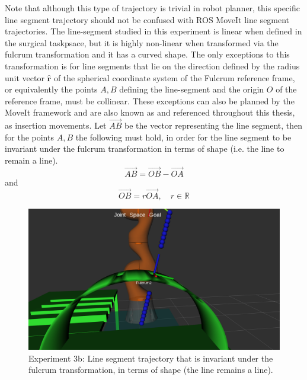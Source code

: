 Note that although this type of trajectory is trivial in robot planner, this specific line segment trajectory should not be confused with ROS MoveIt line segment trajectories. The line-segment studied in this experiment 
is linear when defined in the surgical taskpsace, but it is highly non-linear when transformed via the fulcrum transformation and it has a curved shape. The only exceptions to this transformation is for line segments that 
lie on the direction defined by the radius unit vector $\mathbf{\hat{r}}$ of the spherical coordinate system of the Fulcrum reference frame, or equivalently the points $A,B$ defining the line-segment and the origin $O$ 
of the reference frame, must be collinear. These exceptions can also be planned by the MoveIt framework and are also known 
as and referenced throughout this thesis, as insertion movements. Let $\overrightarrow{AB}$ be the vector representing the line segment, then for the points $A, B$ the following must hold, in order for the line segment to be 
invariant under the fulcrum transformation in terms of shape (i.e. the line to remain a line).
\begin{equation}
\overrightarrow{AB} = \overrightarrow{OB} - \overrightarrow{OA}
\end{equation} 
and
\begin{equation}
\overrightarrow{OB} = r \overrightarrow{OA}, \quad r \in \mathbb{R}
\end{equation}

\begin{center}
\begin{figure}[!htb]
\centering
\includegraphics[width=\textwidth]{images/robot_planner3/3b_line_seg_invariant.png}
\caption{Experiment 3b: Line segment trajectory that is invariant under the fulcrum transformation, in terms of shape (the line remains a line).}
\label{robot-planner3b-line-seg}
\end{figure}
\end{center}


